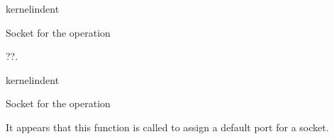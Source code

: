 \documentclass[letterpaper,10pt,english]{sphinxmanual}
\begin{document}
\begin{sphinxuseclass}{kernelindent}
\sphinxAtStartPar
{}
\begin{description}
\sphinxAtStartPar
Socket for the operation

\end{description}

\end{sphinxuseclass}

\begin{fulllineitems}
\label{\detokenize{mtpimpl.c:c.MTP_rehash}}
\pysigstartsignatures
\pysigstartmultiline
{}
\pysigstopmultiline
\pysigstopsignatures
\sphinxAtStartPar
??.

\end{fulllineitems}


\begin{sphinxuseclass}{kernelindent}
\sphinxAtStartPar
{}
\begin{description}
\sphinxAtStartPar
Socket for the operation

\end{description}

\end{sphinxuseclass}

\begin{fulllineitems}
\label{\detokenize{mtpimpl.c:c.MTP_get_port}}
\pysigstartsignatures
\pysigstartmultiline
{}
\pysigstopmultiline
\pysigstopsignatures
\sphinxAtStartPar
It appears that this function is called to assign a default port for a socket.

\end{fulllineitems}
\end{document}
